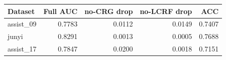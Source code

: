 \begin{tabular}{lrrrr}
\toprule
Dataset & Full AUC & no-CRG drop & no-LCRF drop & ACC \\
\midrule
assist_09 & 0.7783 & 0.0112 & 0.0149 & 0.7407 \\
junyi & 0.8291 & 0.0013 & 0.0005 & 0.7688 \\
assist_17 & 0.7847 & 0.0200 & 0.0018 & 0.7151 \\
\bottomrule
\end{tabular}